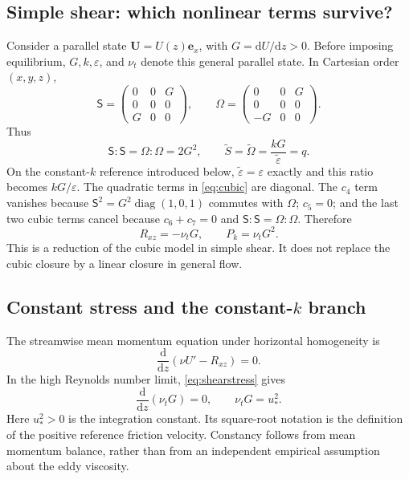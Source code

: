 \documentclass[11pt,a4paper]{article}
\numberwithin{equation}{section}
\newcommand{\dd}{\mathrm{d}}
\newcommand{\eps}{\varepsilon}
\newcommand{\et}{\widetilde{\varepsilon}}
\newcommand{\nut}{\nu_t}
\newcommand{\ust}{u_*}
\newcommand{\diag}{\operatorname{diag}}
\newcommand{\Sm}{\mathsf{S}}
\newcommand{\Om}{\mathsf{\Omega}}
\begin{document}
\subsection{Simple shear: which nonlinear terms survive?}
Consider a parallel state $\bm U=U(z)\bm e_x$, with
$G=\dd U/\dd z>0$. Before imposing equilibrium, $G,k,\eps$, and
$\nut$ denote this general parallel state. In Cartesian order $(x,y,z)$,
\begin{equation}
\Sm=
\begin{pmatrix}0&0&G\\0&0&0\\G&0&0\end{pmatrix},\qquad
\Om=
\begin{pmatrix}0&0&G\\0&0&0\\-G&0&0\end{pmatrix}.
\label{eq:shear-matrices}
\end{equation}
Thus
\begin{equation}
\Sm:\Sm=\Om:\Om=2G^2,\qquad
\widetilde S=\widetilde\Omega=\frac{kG}{\et}=q.
\label{eq:qshear}
\end{equation}
On the constant-$k$ reference introduced below, $\et=\eps$ exactly and
this ratio becomes $kG/\eps$.
The quadratic terms in \cref{eq:cubic} are diagonal.
The $c_4$ term vanishes because
$\Sm^2=G^2\diag(1,0,1)$ commutes with $\Om$; $c_5=0$; and the last two
cubic terms cancel because $c_6+c_7=0$ and
$\Sm:\Sm=\Om:\Om$. Therefore
\begin{equation}
\boxed{R_{xz}=-\nut G,\qquad P_k=\nut G^2.}
\label{eq:shearstress}
\end{equation}
This is a reduction of the cubic model in simple shear. It does not replace
the cubic closure by a linear closure in general flow.

\subsection{Constant stress and the constant-\texorpdfstring{$k$}{k} branch}
The streamwise mean momentum equation under horizontal homogeneity is
\begin{equation}
 \frac{\dd}{\dd z}\left(\nu U'-R_{xz}\right)=0.
 \label{eq:momentum}
\end{equation}
In the high Reynolds number limit, \cref{eq:shearstress} gives
\begin{equation}
 \frac{\dd}{\dd z}(\nut G)=0,\qquad
 \boxed{\nut G=\ust^2.}
 \label{eq:constantstress}
\end{equation}
Here $\ust^2>0$ is the integration constant. Its square-root notation is the
definition of the positive reference friction velocity. Constancy follows
from mean momentum balance, rather than from an independent empirical
assumption about the eddy viscosity.
\end{document}

